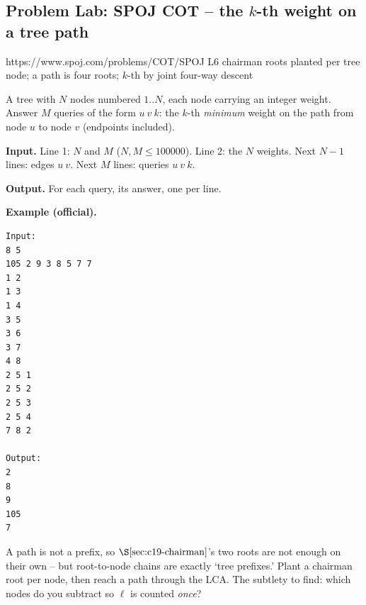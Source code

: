 \subsection{Problem Lab: SPOJ COT -- the \(k\)-th weight on a tree path}

  {https://www.spoj.com/problems/COT/}{SPOJ L6}
  {chairman roots planted per tree node; a path is four roots; \(k\)-th by joint four-way descent}

\begin{problemstatement}
A tree with \(N\) nodes numbered \(1..N\), each node carrying an integer weight. Answer \(M\) queries of the form \(u\ v\ k\): the \(k\)-th \emph{minimum} weight on the path from node \(u\) to node \(v\) (endpoints included).

\textbf{Input.} Line 1: \(N\) and \(M\) (\(N,M\le 100000\)). Line 2: the \(N\) weights. Next \(N-1\) lines: edges \(u\ v\). Next \(M\) lines: queries \(u\ v\ k\).

\textbf{Output.} For each query, its answer, one per line.

\textbf{Example (official).}
\begin{verbatim}
Input:
8 5
105 2 9 3 8 5 7 7
1 2
1 3
1 4
3 5
3 6
3 7
4 8
2 5 1
2 5 2
2 5 3
2 5 4
7 8 2

Output:
2
8
9
105
7
\end{verbatim}
\end{problemstatement}

\begin{attemptgate}
A path is not a prefix, so \(\secref{c19-chairman}\)'s two roots are not enough on their own -- but root-to-node chains are exactly `tree prefixes.' Plant a chairman root per node, then reach a path through the LCA. The subtlety to find: which nodes do you subtract so \(\ell\) is counted \emph{once}?
\end{attemptgate}

